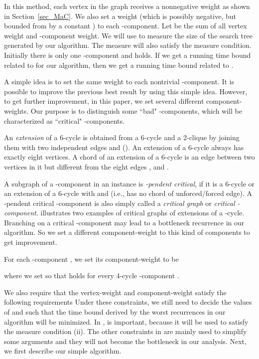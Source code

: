 \documentclass[runningheads]{llncs}
\begin{document}
In this method, each vertex in the graph receives a nonnegative weight as shown in Section~\ref{sec_MaC}. We also set a  weight (which is possibly negative, but bounded from by a constant ) to each -component. Let  be the sum of all vertex weight and -component weight. We will use  to measure the size of the search tree generated by our algorithm.  The measure  will also satisfy the measure condition. Initially there is only one -component and  holds.
If we get a running time bound related to  for our algorithm, then we get a running time bound related to .

A simple idea is to set the same weight to each nontrivial -component.  It is possible to improve the previous best result by using this simple idea. However, to get further improvement, in this paper, we set several different component-weights. Our purpose is to distinguish some ``bad" -components, which will be characterized as  ``critical" -components.

An {\em extension} of a 6-cycle is obtained from a 6-cycle  and a 2-clique 
by joining them with two independent edges  and  ().
An extension of a 6-cycle always has exactly eight vertices.
A chord of an extension of a 6-cycle is an edge between two vertices in it but different from the eight edges
,  and .


A subgraph  of a -component in an instance  is \emph{-pendent critical}, if it is a 6-cycle or an extension of a 6-cycle with
 and 
(i.e.,  has no chord of unforced/forced edge). A -pendent critical -component is also simply called a \emph{critical graph} or \emph{critical -component}.
 illustrates two examples of critical graphs of extensions of a -cycle.
Branching on a critical -component may lead to a bottleneck recurrence in our algorithm.
So we set a different component-weight to this kind of components to get improvement.

\vspace{-0mm}\vspace{-0mm}

For each -component , we set its component-weight   to be

where we set  so that  holds for
every 4-cycle -component .

We also require that the vertex-weight and component-weight satisfy the following requirements
Under these constraints, we still need to decide the values of  and  such that the time bound
derived by the worst recurrences in our algorithm will be minimized.
In ,  is important, because it will be used to satisfy the measure condition (ii).
The other constraints in  are mainly used to simplify some arguments and they will not become the bottleneck in our analysis.
Next, we first describe our simple algorithm.
\end{document}
